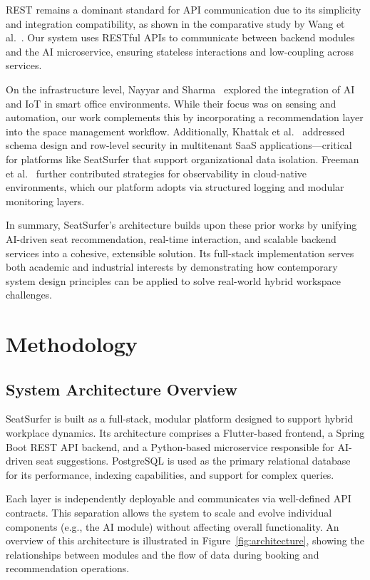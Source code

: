 \documentclass[onecolumn, 12pt]{IEEEtran}
\begin{document}
REST remains a dominant standard for API communication due to its simplicity and integration compatibility, as shown in the comparative study by Wang et al.~\cite{wang2022graphql}. Our system uses RESTful APIs to communicate between backend modules and the AI microservice, ensuring stateless interactions and low-coupling across services.

On the infrastructure level, Nayyar and Sharma~\cite{nayyar2021smart} explored the integration of AI and IoT in smart office environments. While their focus was on sensing and automation, our work complements this by incorporating a recommendation layer into the space management workflow. Additionally, Khattak et al.~\cite{khattak2021schemas} addressed schema design and row-level security in multitenant SaaS applications—critical for platforms like SeatSurfer that support organizational data isolation. Freeman et al.~\cite{freeman2022monitoring} further contributed strategies for observability in cloud-native environments, which our platform adopts via structured logging and modular monitoring layers.

In summary, SeatSurfer's architecture builds upon these prior works by unifying AI-driven seat recommendation, real-time interaction, and scalable backend services into a cohesive, extensible solution. Its full-stack implementation serves both academic and industrial interests by demonstrating how contemporary system design principles can be applied to solve real-world hybrid workspace challenges.

\section{Methodology}

\subsection{System Architecture Overview}

SeatSurfer is built as a full-stack, modular platform designed to support hybrid workplace dynamics. Its architecture comprises a Flutter-based frontend, a Spring Boot REST API backend, and a Python-based microservice responsible for AI-driven seat suggestions. PostgreSQL is used as the primary relational database for its performance, indexing capabilities, and support for complex queries.

Each layer is independently deployable and communicates via well-defined API contracts. This separation allows the system to scale and evolve individual components (e.g., the AI module) without affecting overall functionality. An overview of this architecture is illustrated in Figure~\ref{fig:architecture}, showing the relationships between modules and the flow of data during booking and recommendation operations.
\end{document}
